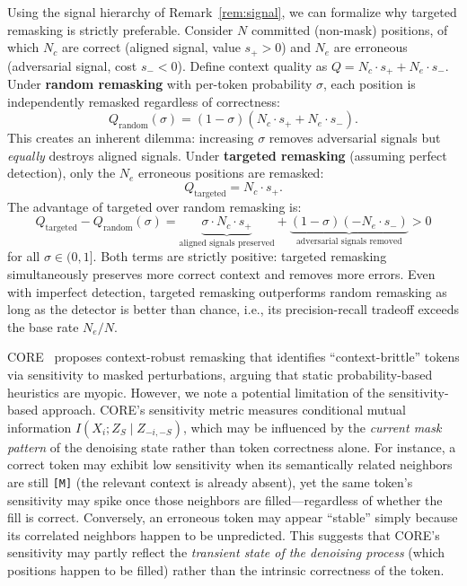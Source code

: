 \documentclass{article}
\newcommand{\mask}{\texttt{[M]}}
\begin{document}
Using the signal hierarchy of Remark~\ref{rem:signal}, we can formalize why targeted remasking is strictly preferable. Consider $N$ committed (non-mask) positions, of which $N_c$ are correct (aligned signal, value $s_+ > 0$) and $N_e$ are erroneous (adversarial signal, cost $s_- < 0$). Define context quality as $Q = N_c \cdot s_+ + N_e \cdot s_-$. Under \textbf{random remasking} with per-token probability $\sigma$, each position is independently remasked regardless of correctness:
\begin{equation}
    Q_{\text{random}}(\sigma) = (1 - \sigma)(N_c \cdot s_+ + N_e \cdot s_-).
    \label{eq:q_random}
\end{equation}
This creates an inherent dilemma: increasing $\sigma$ removes adversarial signals but \emph{equally} destroys aligned signals. Under \textbf{targeted remasking} (assuming perfect detection), only the $N_e$ erroneous positions are remasked:
\begin{equation}
    Q_{\text{targeted}} = N_c \cdot s_+.
    \label{eq:q_targeted}
\end{equation}
The advantage of targeted over random remasking is:
\begin{equation}
    Q_{\text{targeted}} - Q_{\text{random}}(\sigma) = \underbrace{\sigma \cdot N_c \cdot s_+}_{\text{aligned signals preserved}} + \underbrace{(1 - \sigma)(-N_e \cdot s_-)}_{\text{adversarial signals removed}} > 0
    \label{eq:q_advantage}
\end{equation}
for all $\sigma \in (0, 1]$. Both terms are strictly positive: targeted remasking simultaneously preserves more correct context and removes more errors. Even with imperfect detection, targeted remasking outperforms random remasking as long as the detector is better than chance, i.e., its precision-recall tradeoff exceeds the base rate $N_e / N$.

CORE~\citep{zhai2026core} proposes context-robust remasking that identifies ``context-brittle'' tokens via sensitivity to masked perturbations, arguing that static probability-based heuristics are myopic. However, we note a potential limitation of the sensitivity-based approach. CORE's sensitivity metric measures conditional mutual information $I(X_i; Z_S \mid Z_{-i,-S})$, which may be influenced by the \emph{current mask pattern} of the denoising state rather than token correctness alone. For instance, a correct token may exhibit low sensitivity when its semantically related neighbors are still \mask{} (the relevant context is already absent), yet the same token's sensitivity may spike once those neighbors are filled---regardless of whether the fill is correct. Conversely, an erroneous token may appear ``stable'' simply because its correlated neighbors happen to be unpredicted. This suggests that CORE's sensitivity may partly reflect the \emph{transient state of the denoising process} (which positions happen to be filled) rather than the intrinsic correctness of the token.
\end{document}
